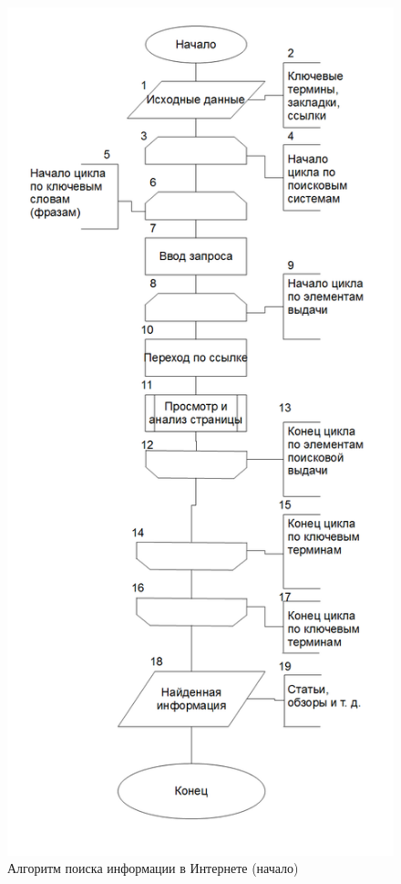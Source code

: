 \begin{figure}[!ht]
	\centering
		\includegraphics[scale=0.5]{images/searchalg.png}
	\caption{\small Алгоритм поиска информации в Интернете (начало)}
	\label{fig:searchalg}
\end{figure}

